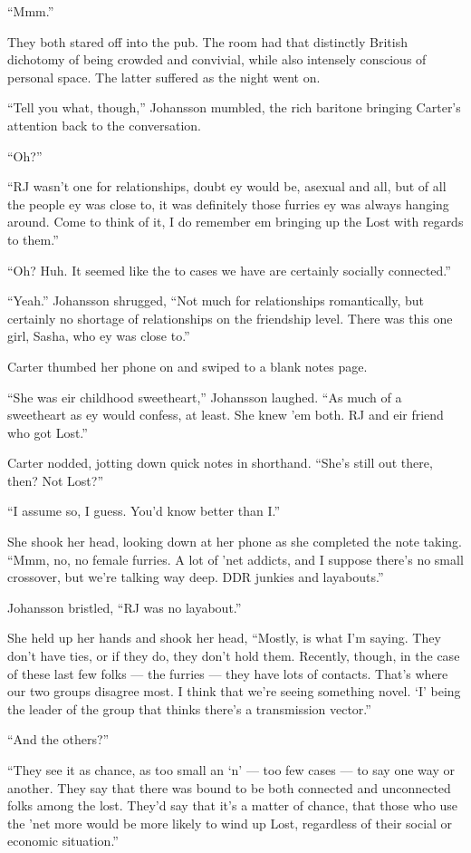 ``Mmm.''

They both stared off into the pub. The room had that distinctly British dichotomy of being crowded and convivial, while also intensely conscious of personal space. The latter suffered as the night went on.

``Tell you what, though,'' Johansson mumbled, the rich baritone bringing Carter's attention back to the conversation.

``Oh?''

``RJ wasn't one for relationships, doubt ey would be, asexual and all, but of all the people ey was close to, it was definitely those furries ey was always hanging around. Come to think of it, I do remember em bringing up the Lost with regards to them.''

``Oh? Huh. It seemed like the to cases we have are certainly socially connected.''

``Yeah.'' Johansson shrugged, ``Not much for relationships romantically, but certainly no shortage of relationships on the friendship level. There was this one girl, Sasha, who ey was close to.''

Carter thumbed her phone on and swiped to a blank notes page.

``She was eir childhood sweetheart,'' Johansson laughed. ``As much of a sweetheart as ey would confess, at least. She knew 'em both. RJ and eir friend who got Lost.''

Carter nodded, jotting down quick notes in shorthand. ``She's still out there, then? Not Lost?''

``I assume so, I guess. You'd know better than I.''

She shook her head, looking down at her phone as she completed the note taking. ``Mmm, no, no female furries. A lot of 'net addicts, and I suppose there's no small crossover, but we're talking way deep. DDR junkies and layabouts.''

Johansson bristled, ``RJ was no layabout.''

She held up her hands and shook her head, ``Mostly, is what I'm saying. They don't have ties, or if they do, they don't hold them. Recently, though, in the case of these last few folks --- the furries --- they have lots of contacts. That's where our two groups disagree most. I think that we're seeing something novel. `I' being the leader of the group that thinks there's a transmission vector.''

``And the others?''

``They see it as chance, as too small an `n' --- too few cases --- to say one way or another. They say that there was bound to be both connected and unconnected folks among the lost. They'd say that it's a matter of chance, that those who use the 'net more would be more likely to wind up Lost, regardless of their social or economic situation.''

